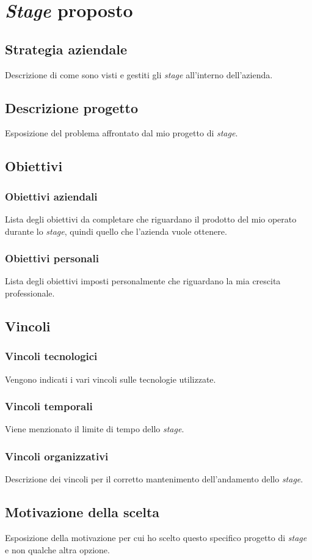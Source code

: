 \chapter{\textit{Stage} proposto}
\label{chap:stage-proposto}

\section{Strategia aziendale}\noindent
Descrizione di come sono visti e gestiti gli \textit{stage} all'interno dell'azienda.

\section{Descrizione progetto}\noindent
Esposizione del problema affrontato dal mio progetto di \textit{stage}.

\section{Obiettivi}

\subsection{Obiettivi aziendali}\noindent
Lista degli obiettivi da completare che riguardano il prodotto del mio operato durante lo \textit{stage}, quindi quello che l'azienda vuole ottenere.

\subsection{Obiettivi personali}\noindent
Lista degli obiettivi imposti personalmente che riguardano la mia crescita professionale.

\section{Vincoli}

\subsection{Vincoli tecnologici}\noindent
Vengono indicati i vari vincoli sulle tecnologie utilizzate.

\subsection{Vincoli temporali}\noindent
Viene menzionato il limite di tempo dello \textit{stage}.

\subsection{Vincoli organizzativi}\noindent
Descrizione dei vincoli per il corretto mantenimento dell'andamento dello \textit{stage}.

\section{Motivazione della scelta}\noindent
Esposizione della motivazione per cui ho scelto questo specifico progetto di \textit{stage} e non qualche altra opzione.